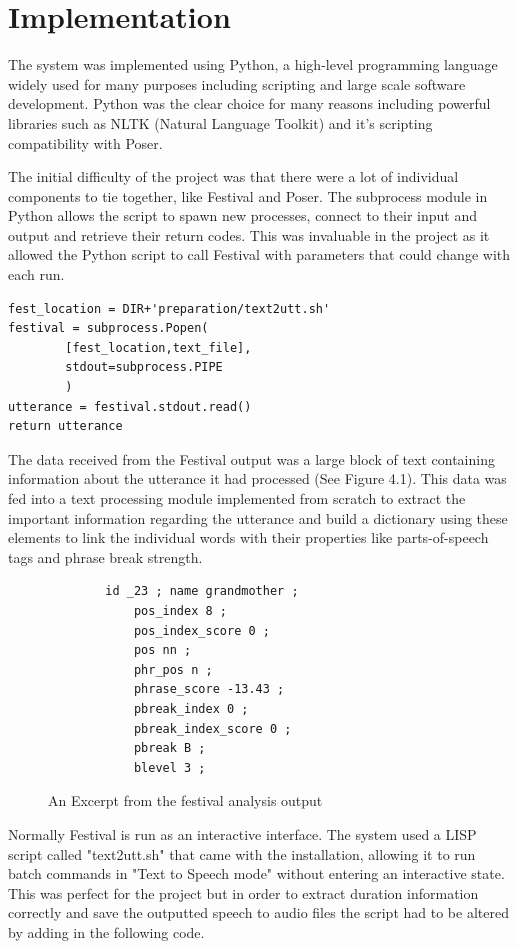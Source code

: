 \documentclass[bsc,frontabs,twoside,singlespacing,parskip]{infthesis}
\begin{document}
\chapter{Implementation}

The system was implemented using Python, a high-level programming language widely used for many purposes including scripting and large scale software development. Python was the clear choice for many reasons including powerful libraries such as NLTK (Natural Language Toolkit) \cite{nltk} and it's scripting compatibility with Poser. 

The initial difficulty of the project was that there were a lot of individual components to tie together, like Festival and Poser. The subprocess module in Python allows the script to spawn new processes, connect to their input and output and retrieve their return codes. This was invaluable in the project as it allowed the Python script to call Festival with parameters that could change with each run.

\begin{lstlisting}
fest_location = DIR+'preparation/text2utt.sh'
festival = subprocess.Popen(
		[fest_location,text_file], 
		stdout=subprocess.PIPE
		)
utterance = festival.stdout.read()
return utterance
\end{lstlisting}

The data received from the Festival output was a large block of text containing information about the utterance it had processed (See Figure 4.1). This data was fed into a text processing module implemented from scratch to extract the important information regarding the utterance and build a dictionary using these elements to link the individual words with their properties like parts-of-speech tags and phrase break strength.

\begin{figure}
	\begin{lstlisting}
		id _23 ; name grandmother ;
			pos_index 8 ;
			pos_index_score 0 ;
			pos nn ; 
			phr_pos n ; 
			phrase_score -13.43 ; 
			pbreak_index 0 ; 
			pbreak_index_score 0 ; 
			pbreak B ; 
			blevel 3 ; 
	\end{lstlisting}
	\caption{An Excerpt from the festival analysis output}
\end{figure}


Normally Festival is run as an interactive interface. The system used a LISP script called "text2utt.sh" that came with the installation, allowing it to run batch commands in "Text to Speech mode" without entering an interactive state. This was perfect for the project but in order to extract duration information correctly and save the outputted speech to audio files the script had to be altered by adding in the following code. 
\end{document}

